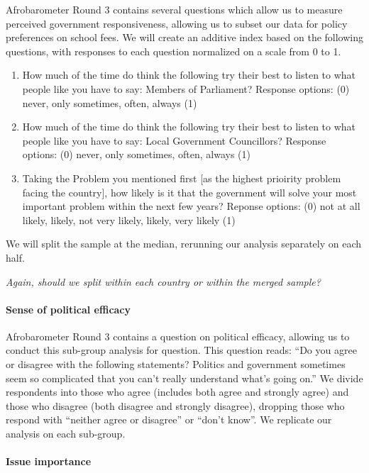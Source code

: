\documentclass[]{article}
\let\oldparagraph\paragraph
\renewcommand{\paragraph}[1]{\oldparagraph{#1}\mbox{}}
\begin{document}
Afrobarometer Round 3 contains several questions which allow us to
measure perceived government responsiveness, allowing us to subset our
data for policy preferences on school fees. We will create an additive
index based on the following questions, with responses to each question
normalized on a scale from 0 to 1.

\begin{enumerate}
  \item How much of the time do think the following try their best to listen to what people like you have to say: Members of Parliament? Response options: (0) never, only sometimes, often, always (1)
  \item How much of the time do think the following try their best to listen to what people like you have to say: Local Government Councillors? Response options: (0) never, only sometimes, often, always (1)
  \item Taking the Problem you mentioned first [as the highest prioirity problem facing the country], how likely is it that the government will solve your most important problem within the next few years? Reponse options: (0) not at all likely, likely, not very likely, likely, very likely (1)
\end{enumerate}

We will split the sample at the median, rerunning our analysis
separately on each half.

\textit{Again, should we split within each country or within the merged sample?}

\paragraph{Sense of political
efficacy}\label{sense-of-political-efficacy}

Afrobarometer Round 3 contains a question on political efficacy,
allowing us to conduct this sub-group analysis for question. This
question reads: ``Do you agree or disagree with the following
statements? Politics and government sometimes seem so complicated that
you can't really understand what's going on.'' We divide respondents
into those who agree (includes both agree and strongly agree) and those
who disagree (both disagree and strongly disagree), dropping those who
respond with ``neither agree or disagree'' or ``don't know''. We
replicate our analysis on each sub-group.

\paragraph{Issue importance}\label{issue-importance}
\end{document}
